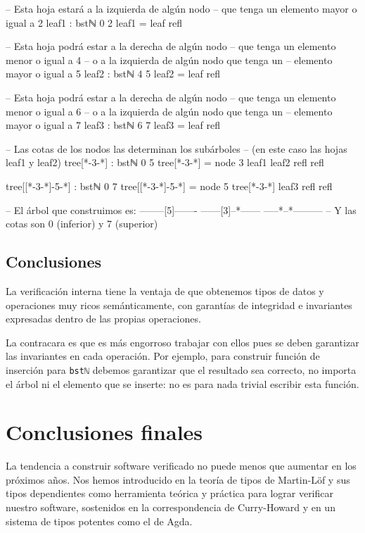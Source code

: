 \documentclass[11pt]{article} %
\begin{document}
\begin{code}
-- Esta hoja estará a la izquierda de algún nodo
-- que tenga un elemento mayor o igual a 2
leaf1 : bstℕ 0 2 
leaf1 = leaf refl

-- Esta hoja podrá estar a la derecha de algún nodo
-- que tenga un elemento menor o igual a 4
-- o a la izquierda de algún nodo que tenga un
-- elemento mayor o igual a 5
leaf2 : bstℕ 4 5
leaf2 = leaf refl

-- Esta hoja podrá estar a la derecha de algún nodo
-- que tenga un elemento menor o igual a 6
-- o a la izquierda de algún nodo que tenga un
-- elemento mayor o igual a 7
leaf3 : bstℕ 6 7
leaf3 = leaf refl


-- Las cotas de los nodos las determinan los subárboles
-- (en este caso las hojas leaf1 y leaf2)
tree[*-3-*] : bstℕ 0 5
tree[*-3-*] = node 3 leaf1 leaf2 refl refl


tree[[*-3-*]-5-*] : bstℕ 0 7
tree[[*-3-*]-5-*] = node 5 tree[*-3-*] leaf3 refl refl


-- El árbol que construimos es:
--------[5]-------
------[3]--*------
-----*--*---------
-- Y las cotas son 0 (inferior) y 7 (superior)
\end{code}

\subsection{Conclusiones}
La verificación interna tiene la ventaja de que obtenemos tipos de datos y operaciones muy ricos semánticamente, con garantías de integridad e invariantes expresadas dentro de las propias operaciones. 

La contracara es que es más engorroso trabajar con ellos pues se deben garantizar las invariantes en cada operación. Por ejemplo, para construir función de inserción para \verb|bstℕ| debemos garantizar que el resultado sea correcto, no importa el árbol ni el elemento que se inserte: no es para nada trivial escribir esta función.

\section{Conclusiones finales}
La tendencia a construir software verificado no puede menos que aumentar en los próximos años. Nos hemos introducido en la teoría de tipos de Martin-Löf y sus tipos dependientes como herramienta teórica y práctica para lograr verificar nuestro software, sostenidos en la correspondencia de Curry-Howard y en un sistema de tipos potentes como el de Agda. 
\end{document}
